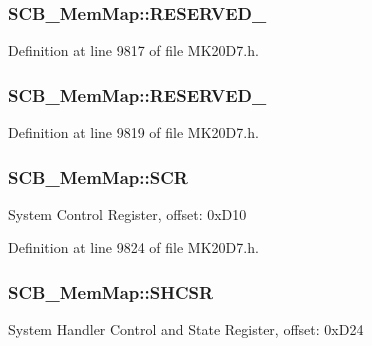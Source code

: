 \subsubsection[{\texorpdfstring{R\+E\+S\+E\+R\+V\+E\+D\+\_\+0}{RESERVED_0}}]{ S\+C\+B\+\_\+\+Mem\+Map\+::\+R\+E\+S\+E\+R\+V\+E\+D\+\_}\hypertarget{struct_s_c_b___mem_map_af7bf3148523b4393be4bbefcfca42536}{}\label{struct_s_c_b___mem_map_af7bf3148523b4393be4bbefcfca42536}


Definition at line 9817 of file M\+K20\+D7.\+h.

\subsubsection[{\texorpdfstring{R\+E\+S\+E\+R\+V\+E\+D\+\_\+1}{RESERVED_1}}]{ S\+C\+B\+\_\+\+Mem\+Map\+::\+R\+E\+S\+E\+R\+V\+E\+D\+\_}\hypertarget{struct_s_c_b___mem_map_a43cc7c47828036be100191e7ebd7115b}{}\label{struct_s_c_b___mem_map_a43cc7c47828036be100191e7ebd7115b}


Definition at line 9819 of file M\+K20\+D7.\+h.

\subsubsection[{\texorpdfstring{S\+CR}{SCR}}]{ S\+C\+B\+\_\+\+Mem\+Map\+::\+S\+CR}\hypertarget{struct_s_c_b___mem_map_ac8d0a0d974bde944d42429065dd2f44a}{}\label{struct_s_c_b___mem_map_ac8d0a0d974bde944d42429065dd2f44a}
System Control Register, offset\+: 0x\+D10 

Definition at line 9824 of file M\+K20\+D7.\+h.

\subsubsection[{\texorpdfstring{S\+H\+C\+SR}{SHCSR}}]{ S\+C\+B\+\_\+\+Mem\+Map\+::\+S\+H\+C\+SR}\hypertarget{struct_s_c_b___mem_map_ae2b73d4b9744b878527466ec57dbfdb7}{}\label{struct_s_c_b___mem_map_ae2b73d4b9744b878527466ec57dbfdb7}
System Handler Control and State Register, offset\+: 0x\+D24 

